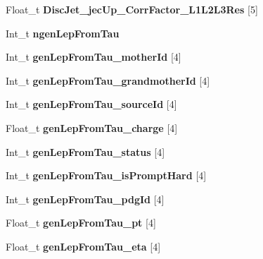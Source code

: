 \begin{DoxyCompactItemize}
Float\+\_\+t {\bfseries Disc\+Jet\+\_\+jec\+Up\+\_\+\+Corr\+Factor\+\_\+\+L1\+L2\+L3\+Res} \mbox{[}5\mbox{]}
\item 
\hypertarget{classMiniTree_abe3fdd7c522ed540f0f9b1e06a2b534f}{}\label{classMiniTree_abe3fdd7c522ed540f0f9b1e06a2b534f} 
Int\+\_\+t {\bfseries ngen\+Lep\+From\+Tau}
\item 
\hypertarget{classMiniTree_a2c1d0b9d1b7e7b295829a540f9e2a0f3}{}\label{classMiniTree_a2c1d0b9d1b7e7b295829a540f9e2a0f3} 
Int\+\_\+t {\bfseries gen\+Lep\+From\+Tau\+\_\+mother\+Id} \mbox{[}4\mbox{]}
\item 
\hypertarget{classMiniTree_a6a67ee70b2643431eb16a306367c4d2e}{}\label{classMiniTree_a6a67ee70b2643431eb16a306367c4d2e} 
Int\+\_\+t {\bfseries gen\+Lep\+From\+Tau\+\_\+grandmother\+Id} \mbox{[}4\mbox{]}
\item 
\hypertarget{classMiniTree_ae2cc2c29a5d12e56870f1ef02c0d5fe6}{}\label{classMiniTree_ae2cc2c29a5d12e56870f1ef02c0d5fe6} 
Int\+\_\+t {\bfseries gen\+Lep\+From\+Tau\+\_\+source\+Id} \mbox{[}4\mbox{]}
\item 
\hypertarget{classMiniTree_a6a84bd905312dea6dc6e04ddc24ef2d7}{}\label{classMiniTree_a6a84bd905312dea6dc6e04ddc24ef2d7} 
Float\+\_\+t {\bfseries gen\+Lep\+From\+Tau\+\_\+charge} \mbox{[}4\mbox{]}
\item 
\hypertarget{classMiniTree_a0d0a2942ecc6a24e94a982245c25f3a9}{}\label{classMiniTree_a0d0a2942ecc6a24e94a982245c25f3a9} 
Int\+\_\+t {\bfseries gen\+Lep\+From\+Tau\+\_\+status} \mbox{[}4\mbox{]}
\item 
\hypertarget{classMiniTree_ae34d097c03ac6bbda78b739341aa384a}{}\label{classMiniTree_ae34d097c03ac6bbda78b739341aa384a} 
Int\+\_\+t {\bfseries gen\+Lep\+From\+Tau\+\_\+is\+Prompt\+Hard} \mbox{[}4\mbox{]}
\item 
\hypertarget{classMiniTree_a6f34383b40e8128c631e575cbe0c3351}{}\label{classMiniTree_a6f34383b40e8128c631e575cbe0c3351} 
Int\+\_\+t {\bfseries gen\+Lep\+From\+Tau\+\_\+pdg\+Id} \mbox{[}4\mbox{]}
\item 
\hypertarget{classMiniTree_afdddbffff70c1b184d51a6c889128db0}{}\label{classMiniTree_afdddbffff70c1b184d51a6c889128db0} 
Float\+\_\+t {\bfseries gen\+Lep\+From\+Tau\+\_\+pt} \mbox{[}4\mbox{]}
\item 
\hypertarget{classMiniTree_a58cea12cb53ab561961654bfe628cf18}{}\label{classMiniTree_a58cea12cb53ab561961654bfe628cf18} 
Float\+\_\+t {\bfseries gen\+Lep\+From\+Tau\+\_\+eta} \mbox{[}4\mbox{]}
\item 
\hypertarget{classMiniTree_a03253f86ac5e9f6d68bc785c6496530e}{}\label{classMiniTree_a03253f86ac5e9f6d68bc785c6496530e} 

\end{DoxyCompactItemize}
